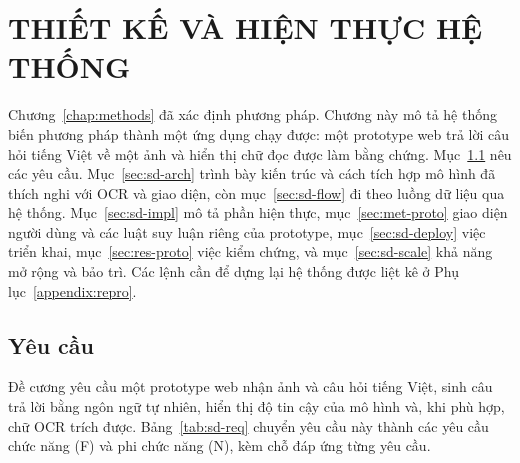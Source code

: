 
\chapter{THIẾT KẾ VÀ HIỆN THỰC HỆ THỐNG}
\label{chap:system}

\ifpdf
    \graphicspath{{Chapter5/Figs/Raster/}{Chapter5/Figs/PDF/}{Chapter5/Figs/}}
\else
    \graphicspath{{Chapter5/Figs/Vector/}{Chapter5/Figs/}}
\fi

Chương~\ref{chap:methods} đã xác định phương pháp. Chương này mô tả hệ thống biến phương
pháp thành một ứng dụng chạy được: một prototype web trả lời câu hỏi tiếng Việt về một
ảnh và hiển thị chữ đọc được làm bằng chứng. Mục~\ref{sec:sd-req} nêu các yêu cầu.
Mục~\ref{sec:sd-arch} trình bày kiến trúc và cách tích hợp mô hình đã thích nghi với OCR
và giao diện, còn mục~\ref{sec:sd-flow} đi theo luồng dữ liệu qua hệ thống.
Mục~\ref{sec:sd-impl} mô tả phần hiện thực, mục~\ref{sec:met-proto} giao diện người dùng
và các luật suy luận riêng của prototype, mục~\ref{sec:sd-deploy} việc triển khai,
mục~\ref{sec:res-proto} việc kiểm chứng, và mục~\ref{sec:sd-scale} khả năng mở rộng và
bảo trì. Các lệnh cần để dựng lại hệ thống được liệt kê ở Phụ lục~\ref{appendix:repro}.

\section{Yêu cầu}
\label{sec:sd-req}

Đề cương yêu cầu một prototype web nhận ảnh và câu hỏi tiếng Việt, sinh câu trả lời bằng
ngôn ngữ tự nhiên, hiển thị độ tin cậy của mô hình và, khi phù hợp, chữ OCR trích được.
Bảng~\ref{tab:sd-req} chuyển yêu cầu này thành các yêu cầu chức năng (F) và phi chức năng
(N), kèm chỗ đáp ứng từng yêu cầu.

